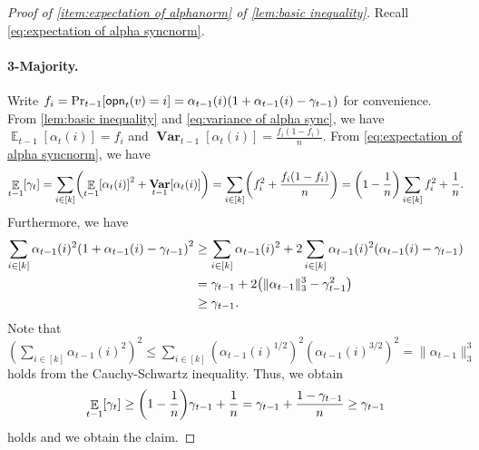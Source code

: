 \documentclass[letterpaper,11pt]{article}
\DeclarePairedDelimiter{\rbra}{\lparen}{\rparen} %
\DeclarePairedDelimiter{\sbra}{\lbrack}{\rbrack} %
\DeclareMathOperator*{\E}{\mathbb{E}}
\DeclareMathOperator*{\Var}{\mathbf{Var}}
\newcommand{\alphanorm}{\gamma}
\newcommand{\opinion}{\mathsf{opn}}
\begin{document}
\begin{proof}[Proof of \cref{item:expectation of alphanorm} of \cref{lem:basic inequality}]
    Recall \cref{eq:expectation of alpha syncnorm}.
    \paragraph*{3-Majority.}
    Write $f_i=\Pr_{t-1}\sbra*{\opinion_t(v)=i}=\alpha_{t-1}(i)(1+\alpha_{t-1}(i)-\alphanorm_{t-1})$ for convenience.
    From 
    \cref{lem:basic inequality} and 
    \cref{eq:variance of alpha sync}, we have 
    $\E_{t-1}[\alpha_t(i)]=f_i$ and 
    $\Var_{t-1}[\alpha_t(i)]=\frac{f_i(1-f_i)}{n}$.
    From \cref{eq:expectation of alpha syncnorm}, we have 
    \begin{align*}
        \E_{t-1}[\alphanorm_t]
        = \sum_{i\in [k]}\rbra*{\E_{t-1}\sbra*{\alpha_t(i)}^2 + \Var_{t-1}\sbra*{\alpha_t(i)}}
        =\sum_{i\in [k]}\rbra*{f_i^2+\frac{f_i(1-f_i)}{n}}
        =\rbra*{1-\frac{1}{n}}\sum_{i\in [k]}f_i^2+\frac{1}{n}.
    \end{align*}
    Furthermore, we have
    \begin{align}
        \sum_{i\in [k]}\alpha_{t-1}(i)^2\rbra*{1+\alpha_{t-1}(i)-\alphanorm_{t-1}}^2
        &\geq \sum_{i\in [k]}\alpha_{t-1}(i)^2+2\sum_{i\in [k]}\alpha_{t-1}(i)^2\rbra*{\alpha_{t-1}(i)-\alphanorm_{t-1}} \nonumber\\
        &=\alphanorm_{t-1}+2\rbra*{\|\alpha_{t-1}\|_3^3-\alphanorm_{t-1}^2}\nonumber \\
        &\geq \alphanorm_{t-1}. \label{eq:squared sum of alpha}
    \end{align}
        Note that $\left(\sum_{i\in [k]}\alpha_{t-1}(i)^2\right)^2\leq \sum_{i\in [k]}(\alpha_{t-1}(i)^{1/2})^2(\alpha_{t-1}(i)^{3/2})^2=\|\alpha_{t-1}\|_3^3$ holds from the Cauchy-Schwartz inequality.
   Thus, we obtain
    \begin{align}
         \E_{t-1}[\alphanorm_t]\geq \rbra*{1-\frac{1}{n}}\alphanorm_{t-1}+\frac{1}{n}
         =\alphanorm_{t-1}+\frac{1-\alphanorm_{t-1}}{n}
         \geq
         \alphanorm_{t-1}
    \end{align}
    holds and we obtain the claim.

\end{proof}
\end{document}
